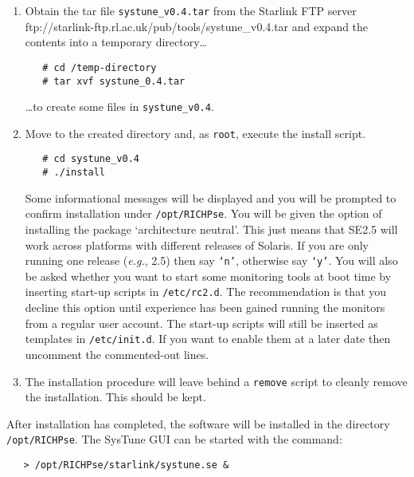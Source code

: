 \begin{enumerate}

\item Obtain the tar file {\tt{systune\_v0.4.tar}} from the Starlink
FTP server \htmladdnormallinkfoot{}
{ftp://starlink-ftp.rl.ac.uk/pub/tools/systune\_v0.4.tar}
and expand the contents into a temporary directory\ldots

\begin{verbatim}
   # cd /temp-directory
   # tar xvf systune_0.4.tar
\end{verbatim}

\ldots to create some files in {\tt{systune\_v0.4}}.

\item Move to the created directory and, as {\tt{root}}, execute the install
script.

\begin{verbatim}
   # cd systune_v0.4
   # ./install
\end{verbatim}

Some informational messages will be displayed and you will be prompted
to confirm installation under {\tt{/opt/RICHPse}}. You will be given
the option of installing the package `architecture neutral'. This just
means that SE2.5 will work across platforms with different releases of
Solaris.  If you are only running one release ({\em{e.g.}}, 2.5) then
say {\tt{`n'}}, otherwise say {\tt{`y'}}. You will also be asked whether
you want to start some monitoring tools at boot time by inserting
start-up scripts in {\tt{/etc/rc2.d}}. The recommendation is that you
decline this option until experience has been gained running the
monitors from a regular user account. The start-up scripts will still
be inserted as templates in {\tt{/etc/init.d}}. If you want to enable
them at a later date then uncomment the commented-out lines.

\item The installation procedure will leave behind a {\tt{remove}} script
to cleanly remove the installation. This should be kept.

\end{enumerate}

After installation has completed, the software will be
installed in the directory {\tt{/opt/RICHPse}}. The SysTune GUI can be
started with the command:

\begin{verbatim}
   > /opt/RICHPse/starlink/systune.se &
\end{verbatim}

